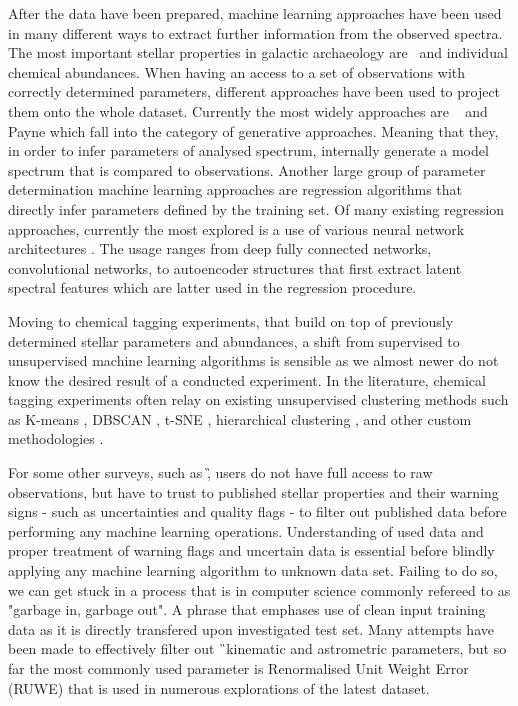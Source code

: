 After the data have been prepared, machine learning approaches have been used in many different ways to extract further information from the observed spectra. The most important stellar properties in galactic archaeology are \Feh\ and individual chemical abundances. When having an access to a set of observations with correctly determined parameters, different approaches have been used to project them onto the whole dataset. Currently the most widely approaches are \TC\ \cite{2015ApJ...808...16N, buder2018} and Payne \citep{2019ApJ...879...69T} which fall into the category of generative approaches. Meaning that they, in order to infer parameters of analysed spectrum, internally generate a model spectrum that is compared to observations. Another large group of parameter determination machine learning approaches are regression algorithms that directly infer parameters defined by the training set. Of many existing regression approaches, currently the most explored is a use of various neural network architectures \citep{2015MNRAS.452..158Y, 2019MNRAS.483.3255L, 2020ApJ...891...23W, 2020arXiv200208390O}. The usage ranges from deep fully connected networks, convolutional networks, to autoencoder structures that first extract latent spectral features which are latter used in the regression procedure.

Moving to chemical tagging experiments, that build on top of previously determined stellar parameters and abundances, a shift from supervised to unsupervised machine learning algorithms is sensible as we almost newer do not know the desired result of a conducted experiment. In the literature, chemical tagging experiments often relay on existing unsupervised clustering methods such as K-means \cite{2015A&A...577A..47B, 2016ApJ...833..262H, 2018ApJ...860...70C}, DBSCAN \cite{2019MNRAS.487..871P}, t-SNE \cite{2018MNRAS.473.4612K, 2018A&A...619A.125A}, hierarchical clustering \cite{2017MNRAS.467.1140J, 2018A&A...618A..65B}, and other custom methodologies \cite{2019ApJ...887...73C}.

For some other surveys, such as \G, users do not have full access to raw observations, but have to trust to published stellar properties and their warning signs - such as uncertainties and quality flags - to filter out published data before performing any machine learning operations. Understanding of used data and proper treatment of warning flags and uncertain data is essential before blindly applying any machine learning algorithm to unknown data set. Failing to do so, we can get stuck in a process that is in computer science commonly refereed to as "garbage in, garbage out". A phrase that emphases use of clean input training data as it is directly transfered upon investigated test set. Many attempts have been made to effectively filter out \G\ kinematic and astrometric parameters, but so far the most commonly used parameter is Renormalised Unit Weight Error (RUWE) \cite{ruwe} that is used in numerous explorations of the latest dataset. 

